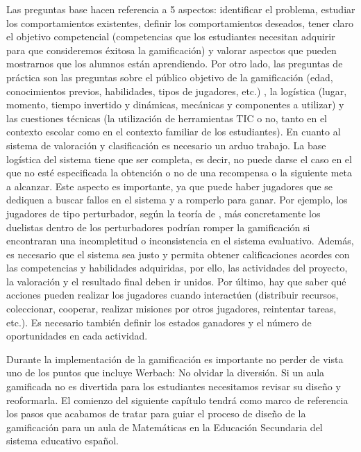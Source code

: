 Las preguntas base hacen referencia a 5 aspectos: identificar el problema, estudiar los comportamientos existentes, definir los comportamientos deseados, tener claro el objetivo competencial (competencias que los estudiantes necesitan adquirir para que consideremos éxitosa la gamificación) y valorar aspectos que pueden mostrarnos que los alumnos están aprendiendo.
%
Por otro lado, las preguntas de práctica son las preguntas sobre el público objetivo de la gamificación (edad, conocimientos previos, habilidades, tipos de jugadores, etc.) , la logística (lugar, momento, tiempo invertido y dinámicas, mecánicas y componentes a utilizar) y las cuestiones técnicas (la utilización de herramientas TIC o no, tanto en el contexto escolar como en el contexto familiar de los estudiantes).
%
En cuanto al sistema de valoración y clasificación es necesario un arduo trabajo.
%
La base logística del sistema tiene que ser completa, es decir, no puede darse el caso en el que no esté especificada la obtención o no de una recompensa o la siguiente meta a alcanzar.
%
Este aspecto es importante, ya que puede haber jugadores que se dediquen a buscar fallos en el sistema y a romperlo para ganar.
%
Por ejemplo, los jugadores de tipo perturbador, según la teoría de \cite{marczewski}, más concretamente los duelistas dentro de los perturbadores podrían romper la gamificación si encontraran una incompletitud o inconsistencia en el sistema evaluativo.
%
Además, es necesario que el sistema sea justo y permita obtener calificaciones acordes con las competencias y habilidades adquiridas, por ello, las actividades del proyecto, la valoración y el resultado final deben ir unidos.
%
Por último, hay que saber qué acciones pueden realizar los jugadores cuando interactúen (distribuir recursos, coleccionar, cooperar, realizar misiones por otros jugadores, reintentar tareas, etc.). 
%
Es necesario también definir los estados ganadores y el número de oportunidades en cada actividad.

Durante la implementación de la gamificación es importante no perder de vista uno de los puntos que incluye Werbach: No olvidar la diversión.
%
Si un aula gamificada no es divertida para los estudiantes necesitamos revisar su diseño y reoformarla.
%
El comienzo del siguiente capítulo tendrá como marco de referencia los pasos que acabamos de tratar para guiar el proceso de diseño de la gamificación para un aula de Matemáticas en la Educación Secundaria del sistema educativo español.


